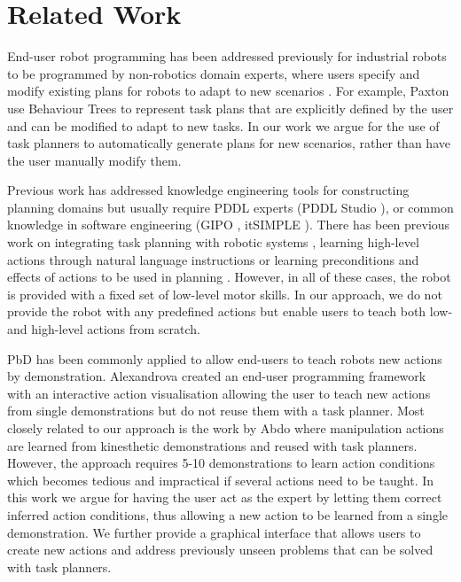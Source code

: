 \section{Related Work} \label{sec:relatedwork}
End-user robot programming has been addressed previously for industrial robots to be programmed by non-robotics domain experts, where users specify and modify existing plans for robots to adapt to new scenarios \cite{paxton2017costar,perzylo2016intuitive,stenmark2017simplified}.
For example, Paxton \etal \cite{paxton2017costar} use Behaviour Trees to represent task plans that are explicitly defined by the user and can be modified to adapt to new tasks.
In our work we argue for the use of task planners to automatically generate plans for new scenarios, rather than have the user manually modify them.

Previous work has addressed knowledge engineering tools for constructing planning domains but usually require PDDL experts (PDDL Studio \cite{plch2012inspect}), or common knowledge in software engineering (GIPO \cite{simpson2007planning}, itSIMPLE \cite{vaquero2013itsimple}).
There has been previous work on integrating task planning with robotic systems \cite{cashmore2015rosplan,kuhner2018closed}, learning high-level actions through natural language instructions \cite{she2014teaching} or learning preconditions and effects of actions to be used in planning \cite{jetchev2013learning,konidaris2018fromSkills,ugur2015bottom}.
However, in all of these cases, the robot is provided with a fixed set of low-level motor skills.
In our approach, we do not provide the robot with any predefined actions but enable users to teach both low- and high-level actions from scratch.

PbD has been commonly applied to allow end-users to teach robots new actions by demonstration.
Alexandrova \etal \cite{alexandrova2014robot} created an end-user programming framework with an interactive action visualisation allowing the user to teach new actions from single demonstrations but do not reuse them with a task planner.
Most closely related to our approach is the work by Abdo \etal \cite{abdo2013learning} where manipulation actions are learned from kinesthetic demonstrations and reused with task planners.
However, the approach requires 5-10 demonstrations to learn action conditions which becomes tedious and impractical if several actions need to be taught.
In this work we argue for having the user act as the expert by letting them correct inferred action conditions, thus allowing a new action to be learned from a single demonstration.
We further provide a graphical interface that allows users to create new actions and address previously unseen problems that can be solved with task planners.


